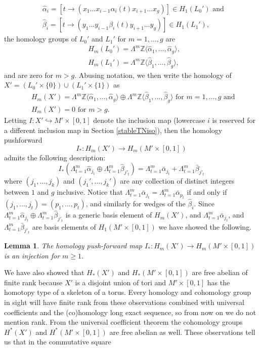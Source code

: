 \documentclass[11pt]{amsart}
\newtheorem{lemma}[theorem]{Lemma}
\theoremstyle{definition}
\theoremstyle{remark}
\def\Z{\mathbb{Z}}
\numberwithin{equation}{section}
\begin{document}
\begin{align}
&\hat{\alpha}_i=[t\to (x_1\hdots x_{i-1}\alpha_i(t)x_{i+1}\hdots x_g)]\in H_1(L_0')\textrm{ and }\\
&\hat{\beta}_i=[t\to (y_1\hdots y_{i-1}\beta_i(t)y_{i+1}\hdots y_g)]\in H_1(L_1'),
\end{align}
the homology groups of $L_0'$ and $L_1'$ for $m=1,\hdots,g$ are 
\begin{align}
&H_m(L_0')=\Lambda^m\Z\langle \hat{\alpha}_1,\hdots, \hat{\alpha}_g\rangle,\\
&H_m(L_1')=\Lambda^m\Z\langle \hat{\beta}_1,\hdots, \hat{\beta}_g\rangle,
\end{align}
and are zero for $m>g.$ Abusing notation, we then write the homology of $X'=(L_0'\times\{0\})\cup(L_1'\times\{1\})$  as 
\begin{align}
&H_m(X')=\Lambda^m\Z\langle \hat{\alpha}_1,\hdots, \hat{\alpha}_g\rangle\oplus \Lambda^m\Z\langle \hat{\beta}_1,\hdots, \hat{\beta}_g\rangle\textrm{ for }m=1,\hdots,g\textrm{ and }\\
&H_m(X')=0\textrm{ for }m>g.
\end{align}
Letting $I\colon  X'\hookrightarrow M'\times[0,1]$ denote the inclusion map (lowercase $i$ is reserved for a different inclusion map in Section \ref{stableTNiso}), then the homology pushforward \[I_*\colon H_m(X')\to H_m(M'\times[0,1])\] admits the following description:
\begin{equation}
    I_*(\Lambda^m_{t=1}\hat{\alpha}_{j_t}\oplus \Lambda^m_{t=1}\hat{\beta}_{j'_t})= \Lambda^m_{t=1}\bar{\alpha}_{j_t}+\Lambda^m_{t=1}\bar{\beta}_{j'_t}
\end{equation}
where $(j_1,\hdots ,j_k)$ and $(j_1',\hdots ,j_k')$ are any collection of distinct integers between $1$ and $g$ inclusive. Notice that $\Lambda^m_{t=1}\bar{\alpha}_{j_t}= \Lambda^m_{t=1}\bar{\alpha}_{p_t}$ if and only if $(j_1,\hdots ,j_t)=(p_1,\hdots ,p_t)$, and similarly for wedges of the $\hat{\beta}_i$. Since $\Lambda^m_{t=1}\hat{\alpha}_{j_t}\oplus \Lambda^m_{t=1}\hat{\beta}_{j'_t}$ is a generic basis element of $H_m(X')$, and $\Lambda^m_{t=1}\bar{\alpha}_{j_t}$, and $\Lambda^m_{t=1}\bar{\beta}_{j'_t}$ are basis elements of $H_1(M'\times [0,1])$ we have showed the following.

\begin{lemma}The homology push-forward map $I_*\colon H_m(X')\to H_m(M'\times[0,1])$
is an injection for $m\ge1$.\end{lemma} 

We have also showed that $H_*(X')$ and $H_*(M'\times[0,1])$ are free abelian of finite rank because $X'$ is a disjoint union of tori and $M'\times[0,1]$ has the homotopy type of a skeleton of a torus. Every homology and cohomology group in sight will have finite rank from these observations combined with universal coefficients and the (co)homology long exact sequence, so from now on we do not mention rank. From the universal coefficient theorem the cohomology groups $H^*(X')$ and $H^*(M'\times [0,1])$ are free abelian as well. These observations tell us that in the commutative square
\end{document}
